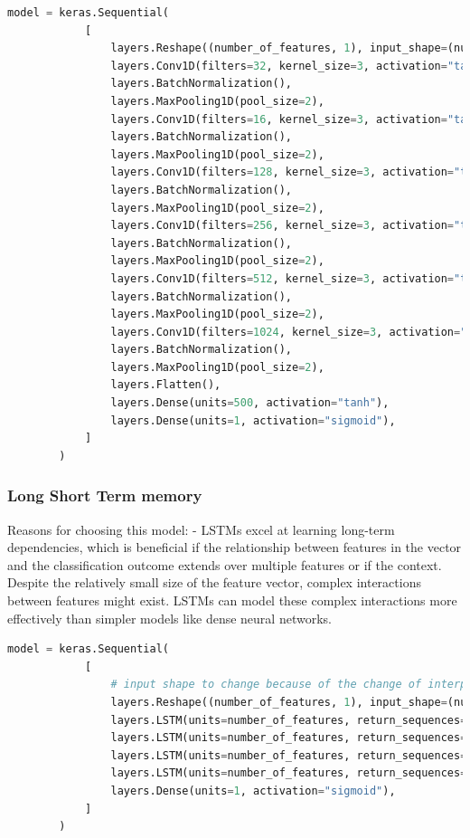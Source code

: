 \documentclass{article}
\begin{document}
    \begin{lstlisting}[language=Python, caption=CNN on feature vector architecture]
        model = keras.Sequential(
            [
                layers.Reshape((number_of_features, 1), input_shape=(number_of_features,)),
                layers.Conv1D(filters=32, kernel_size=3, activation="tanh"),
                layers.BatchNormalization(),
                layers.MaxPooling1D(pool_size=2),
                layers.Conv1D(filters=16, kernel_size=3, activation="tanh"),
                layers.BatchNormalization(),
                layers.MaxPooling1D(pool_size=2),
                layers.Conv1D(filters=128, kernel_size=3, activation="tanh"),
                layers.BatchNormalization(),
                layers.MaxPooling1D(pool_size=2),
                layers.Conv1D(filters=256, kernel_size=3, activation="tanh"),
                layers.BatchNormalization(),
                layers.MaxPooling1D(pool_size=2),
                layers.Conv1D(filters=512, kernel_size=3, activation="tanh"),
                layers.BatchNormalization(),
                layers.MaxPooling1D(pool_size=2),
                layers.Conv1D(filters=1024, kernel_size=3, activation="tanh"),
                layers.BatchNormalization(),
                layers.MaxPooling1D(pool_size=2),
                layers.Flatten(),
                layers.Dense(units=500, activation="tanh"),
                layers.Dense(units=1, activation="sigmoid"),
            ]
        )
    \end{lstlisting}

    \subsubsection{Long Short Term memory}
    Reasons for choosing this model:
    - LSTMs excel at learning long-term dependencies, which is beneficial if the relationship between features in the vector and the classification outcome extends over multiple features or if the context.
    Despite the relatively small size of the feature vector, complex interactions between features might exist.
    LSTMs can model these complex interactions more effectively than simpler models like dense neural networks.


    \begin{lstlisting}[language=Python, caption=LSTM on feature vector architecture]
        model = keras.Sequential(
            [
                # input shape to change because of the change of interpretation of the features
                layers.Reshape((number_of_features, 1), input_shape=(number_of_features,)),
                layers.LSTM(units=number_of_features, return_sequences=True),
                layers.LSTM(units=number_of_features, return_sequences=True),
                layers.LSTM(units=number_of_features, return_sequences=True),
                layers.LSTM(units=number_of_features, return_sequences=False),
                layers.Dense(units=1, activation="sigmoid"),
            ]
        )
    \end{lstlisting}
\end{document}

